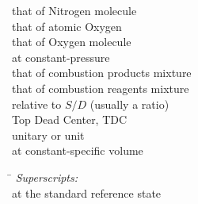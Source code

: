 \begin{tabbing}
           \> that of Nitrogen molecule                                                                                                                \\
            \> that of atomic Oxygen                                                                                                                    \\
           \> that of Oxygen molecule                                                                                                                  \\
                                      \> at constant-pressure                                                                                                                     \\
             \> that of combustion products mixture                                                                                                      \\
             \> that of combustion reagents mixture                                                                                                      \\
                                   \> relative to $S/D$ (usually a ratio)                                                                                                      \\
    \tcs{{}_{\tdc}}                             \> Top Dead Center, TDC                                                                                                                     \\
                                      \> unitary or unit                                                                                                                          \\
                                      \> at constant-specific volume                                                                                                              \\
\end{tabbing}
                                                                                                                      
\begin{tabbing}\hspace*{\lensymb}\=\hspace*{\lenWHAT}\kill
    {\em Superscripts:} \\                                                                       
                                      \> at the standard reference state                                                                                          \\
\end{tabbing}

